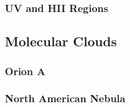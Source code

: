 \subsubsection{UV and HII Regions}

\subsection{Molecular Clouds}

\subsubsection{Orion A}

\subsubsection{North American Nebula}
  
  
  
  
  